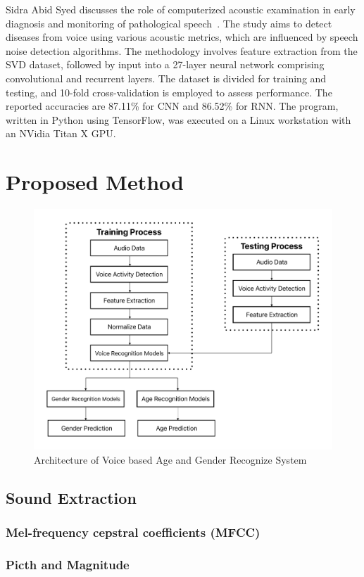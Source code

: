 \documentclass[conference, 10pt,onecolumn]{IEEEtran}
\begin{document}
Sidra Abid Syed discusses the role of computerized acoustic examination in early diagnosis and monitoring of pathological speech~\cite{syed2021comparative}. The study aims to detect diseases from voice using various acoustic metrics, which are influenced by speech noise detection algorithms. The methodology involves feature extraction from the SVD dataset, followed by input into a 27-layer neural network comprising convolutional and recurrent layers. The dataset is divided for training and testing, and 10-fold cross-validation is employed to assess performance. The reported accuracies are 87.11\% for CNN and 86.52\% for RNN. The program, written in Python using TensorFlow, was executed on a Linux workstation with an NVidia Titan X GPU.
\section{Proposed Method}

\begin{figure}
    \centering
    \includegraphics[width=3.5 in]{Research Architecture.pdf}
    \caption{Architecture of Voice based Age and Gender Recognize System}
    \label{fig:Research Architecture}
\end{figure}

\subsection{Sound Extraction}
\subsubsection{Mel-frequency cepstral coefficients (MFCC)}
\subsubsection{Picth and Magnitude}
\end{document}
